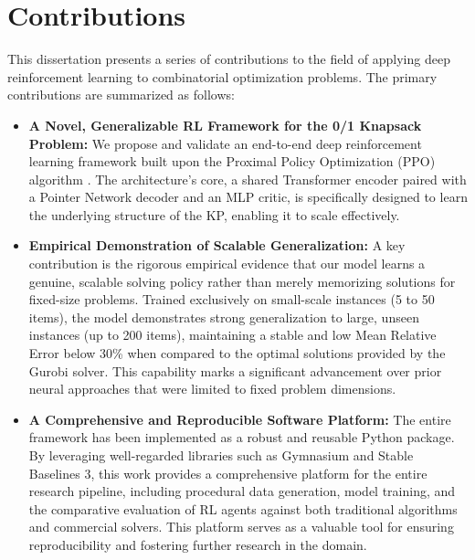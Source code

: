 \section{Contributions}

This dissertation presents a series of contributions to the field of applying deep reinforcement learning to combinatorial optimization problems. The primary contributions are summarized as follows:

\begin{itemize}
    \item \textbf{A Novel, Generalizable RL Framework for the 0/1 Knapsack Problem:} We propose and validate an end-to-end deep reinforcement learning framework built upon the Proximal Policy Optimization (PPO) algorithm \cite{schulmanProximalPolicyOptimization2017}. The architecture's core, a shared Transformer encoder \cite{koolAttentionLearnSolve2019a} paired with a Pointer Network decoder \cite{belloNeuralCombinatorialOptimization2017} and an MLP critic, is specifically designed to learn the underlying structure of the KP, enabling it to scale effectively.

    \item \textbf{Empirical Demonstration of Scalable Generalization:} A key contribution is the rigorous empirical evidence that our model learns a genuine, scalable solving policy rather than merely memorizing solutions for fixed-size problems. Trained exclusively on small-scale instances (5 to 50 items), the model demonstrates strong generalization to large, unseen instances (up to 200 items), maintaining a stable and low Mean Relative Error below 30\% when compared to the optimal solutions provided by the Gurobi solver. This capability marks a significant advancement over prior neural approaches that were limited to fixed problem dimensions.

    \item \textbf{A Comprehensive and Reproducible Software Platform:} The entire framework has been implemented as a robust and reusable Python package. By leveraging well-regarded libraries such as Gymnasium and Stable Baselines 3, this work provides a comprehensive platform for the entire research pipeline, including procedural data generation, model training, and the comparative evaluation of RL agents against both traditional algorithms and commercial solvers. This platform serves as a valuable tool for ensuring reproducibility and fostering further research in the domain.
\end{itemize}